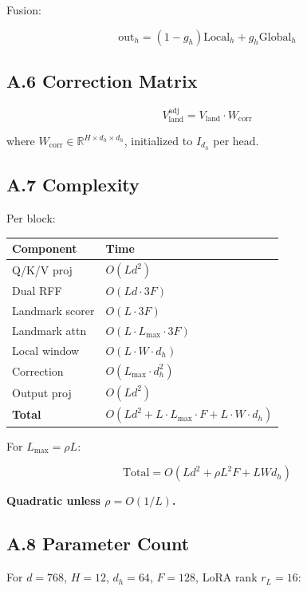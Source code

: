 Fusion:

\[
\text{out}_h = (1 - g_h) \text{Local}_h + g_h \text{Global}_h
\tag{A.12}
\]

\subsection{A.6 Correction Matrix}

\[
V_\text{land}^\text{adj} = V_\text{land} \cdot W_\text{corr}
\tag{A.13}
\]

where $W_\text{corr} \in \mathbb{R}^{H \times d_h \times d_h}$, initialized 
to $I_{d_h}$ per head.

\subsection{A.7 Complexity}

Per block:

\begin{table}[H]
\centering
\small
\begin{tabular}{ll}
\toprule
\textbf{Component} & \textbf{Time} \\
\midrule
Q/K/V proj & $O(L d^2)$ \\
Dual RFF & $O(L d \cdot 3F)$ \\
Landmark scorer & $O(L \cdot 3F)$ \\
Landmark attn & $O(L \cdot L_\text{max} \cdot 3F)$ \\
Local window & $O(L \cdot W \cdot d_h)$ \\
Correction & $O(L_\text{max} \cdot d_h^2)$ \\
Output proj & $O(L d^2)$ \\
\textbf{Total} & $O(L d^2 + L \cdot L_\text{max} \cdot F + L \cdot W \cdot d_h)$ \\
\bottomrule
\end{tabular}
\end{table}

For $L_\text{max} = \rho L$:

\[
\text{Total} = O(L d^2 + \rho L^2 F + L W d_h)
\]

\textbf{Quadratic unless $\rho = O(1/L)$.}

\subsection{A.8 Parameter Count}

For $d = 768$, $H = 12$, $d_h = 64$, $F = 128$, LoRA rank $r_L = 16$:

